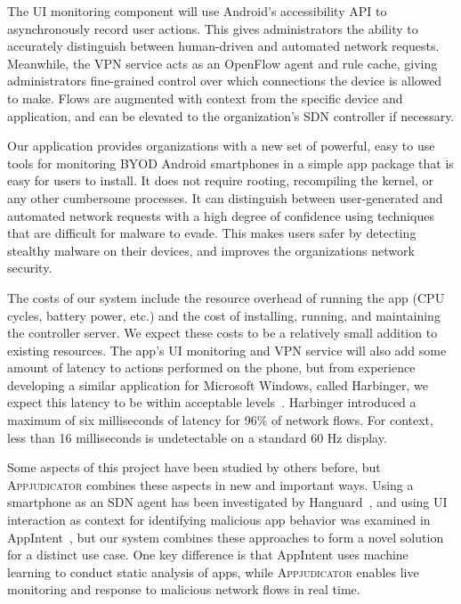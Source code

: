 The UI monitoring component will use Android's accessibility API to asynchronously record user actions. This gives administrators the ability to accurately distinguish between human-driven and automated network requests. Meanwhile, the VPN service acts as an OpenFlow agent and rule cache, giving administrators fine-grained control over which connections the device is allowed to make. Flows are augmented with context from the specific device and application, and can be elevated to the organization's SDN controller if necessary.


Our application provides organizations with a new set of powerful, easy to use tools for monitoring BYOD Android smartphones in a simple app package that is easy for users to install. It does not require rooting, recompiling the kernel, or any other cumbersome processes. It can distinguish between user-generated and automated network requests with a high degree of confidence using techniques that are difficult for malware to evade. This makes users safer by detecting stealthy malware on their devices, and improves the organizations network security.

The costs of our system include the resource overhead of running the app (CPU cycles, battery power, etc.) and the cost of installing, running, and maintaining the controller server. We expect these costs to be a relatively small addition to existing resources. The app's UI monitoring and VPN service will also add some amount of latency to actions performed on the phone, but from experience developing a similar application for Microsoft Windows, called Harbinger, we expect this latency to be within acceptable levels~\cite{chuluundorj2019}. Harbinger introduced a maximum of six milliseconds of latency for 96\% of network flows. For context, less than 16 milliseconds is undetectable on a standard 60 Hz display.


Some aspects of this project have been studied by others before, but \textsc{Appjudicator} combines these aspects in new and important ways. Using a smartphone as an SDN agent has been investigated by Hanguard~\cite{demetriou2017}, and using UI interaction as context for identifying malicious app behavior was examined in AppIntent~\cite{yang2013}, but our system combines these approaches to form a novel solution for a distinct use case. One key difference is that AppIntent uses machine learning to conduct static analysis of apps, while \textsc{Appjudicator} enables live monitoring and response to malicious network flows in real time.


